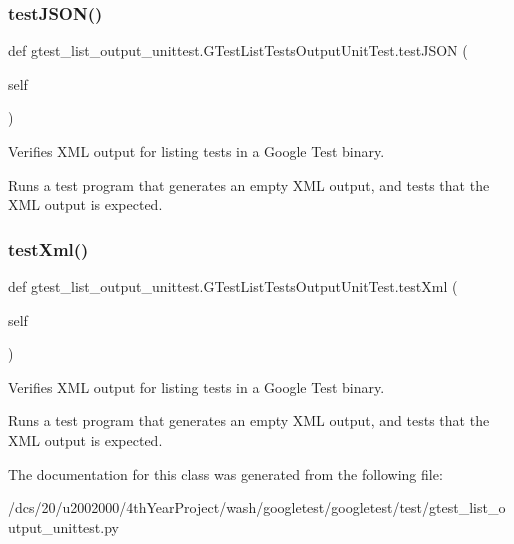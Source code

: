\subsubsection{\texorpdfstring{test\+J\+S\+O\+N()}{testJSON()}}
{\footnotesize\ttfamily def gtest\+\_\+list\+\_\+output\+\_\+unittest.\+G\+Test\+List\+Tests\+Output\+Unit\+Test.\+test\+J\+S\+ON (\begin{DoxyParamCaption}\item[{}]{self }\end{DoxyParamCaption})}

\begin{DoxyVerb}Verifies XML output for listing tests in a Google Test binary.

Runs a test program that generates an empty XML output, and
tests that the XML output is expected.
\end{DoxyVerb}
 \mbox{\label{classgtest__list__output__unittest_1_1GTestListTestsOutputUnitTest_ad3088bc8ee3a0abdabbf1b90507e272e}} 
\subsubsection{\texorpdfstring{test\+Xml()}{testXml()}}
{\footnotesize\ttfamily def gtest\+\_\+list\+\_\+output\+\_\+unittest.\+G\+Test\+List\+Tests\+Output\+Unit\+Test.\+test\+Xml (\begin{DoxyParamCaption}\item[{}]{self }\end{DoxyParamCaption})}

\begin{DoxyVerb}Verifies XML output for listing tests in a Google Test binary.

Runs a test program that generates an empty XML output, and
tests that the XML output is expected.
\end{DoxyVerb}
 

The documentation for this class was generated from the following file\+:\begin{DoxyCompactItemize}
\item 
/dcs/20/u2002000/4th\+Year\+Project/wash/googletest/googletest/test/gtest\+\_\+list\+\_\+output\+\_\+unittest.\+py\end{DoxyCompactItemize}
